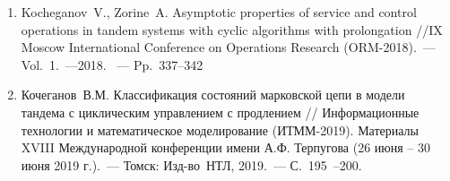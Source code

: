 \begin{enumerate}[resume]
\item Kocheganov~V., Zorine~A. Asymptotic properties of service and control operations in tandem systems with cyclic algorithms with prolongation //IX Moscow International Conference on Operations Research (ORM-2018).~--- Vol.~1.~---2018. ~--- Pp.~337--342
\item  Кочеганов~В.М. Классификация состояний марковской цепи в модели тандема с циклическим управлением с продлением // Информационные технологии и математическое моделирование (ИТММ-2019). Материалы
XVIII Международной конференции имени А.Ф. Терпугова (26 июня -- 30 июня 2019 г.).~--- Томск: Изд-во~НТЛ, 2019.~--- С.~195~--200.
\end{enumerate}	

